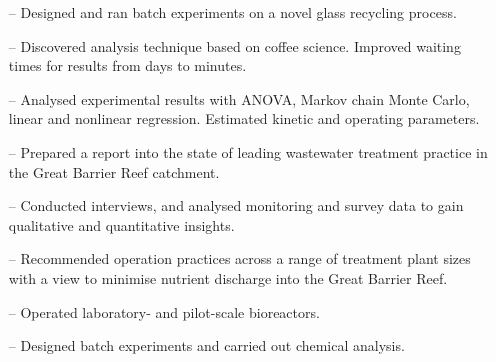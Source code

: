 \documentclass[10.5pt,a4paper]{altacv}
\begin{document}
\begin{itemize}
    \setlength{\itemindent}{0.3em}
    \item[--]   \small{Designed and ran batch experiments on a novel glass 
    recycling process.}
    \item[--]   \small{Discovered analysis technique based on 
    coffee science. Improved waiting times for results from days to minutes.}
    \item[--]   \small{Analysed experimental results with ANOVA, Markov chain Monte
    Carlo, linear and nonlinear regression. Estimated kinetic and operating parameters.}
\end{itemize}
\divider\smallskip

\begin{itemize}
    \setlength{\itemindent}{0.3em}
    \item[--]   \small{Prepared a report into the state of leading 
    wastewater treatment practice in the Great Barrier Reef catchment.}
    \item[--]   \small{Conducted interviews, and analysed monitoring 
    and survey data to gain qualitative and quantitative insights.}
    \item[--]   \small{Recommended operation practices across a 
    range of treatment plant sizes with a view to minimise
    nutrient discharge into the Great Barrier Reef.}
\end{itemize}
\divider\smallskip


\begin{itemize}
    \setlength{\itemindent}{0.3em}
    \item[--]   \small{Operated laboratory- and pilot-scale bioreactors.}
    \item[--]   \small{Designed batch experiments and carried out chemical
    analysis.}
\end{itemize}

\divider\medskip

\newpage
\end{document}
